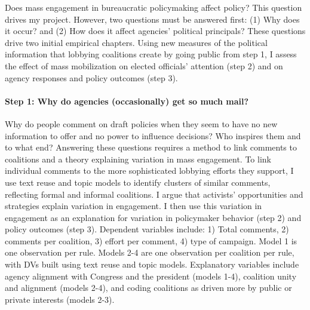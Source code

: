 Does mass engagement in bureaucratic policymaking affect policy? This question drives my project. However, two questions must be answered first: (1) Why does it occur? and (2) How does it affect agencies' political principals? These questions drive two initial empirical chapters.
Using new measures of the political information that lobbying coalitions create by going public from step 1, I assess the effect of mass mobilization on elected officials' attention (step 2) and on agency responses and policy outcomes (step 3).%

\paragraph{Step 1: Why do agencies (occasionally) get so much mail?} 



Why do people comment on draft policies when they seem to have no new information to offer and no power to influence decisions? Who inspires them and to what end? 
Answering these questions requires a method to link comments to coalitions and a theory explaining variation in mass engagement.  
To link individual comments to the more sophisticated lobbying efforts they support, I use text reuse and topic models to identify clusters of similar comments, reflecting formal and informal coalitions.
I argue that activists' opportunities and strategies explain variation in engagement. %
I then use this variation in engagement as an explanation for variation in policymaker behavior (step 2) and policy outcomes (step 3). 
Dependent variables include: 
1) Total comments, %
2) comments per coalition, %
3) effort per comment, %
4) type of campaign. %
Model 1 is one observation per rule. Models 2-4 are one observation per coalition per rule, with DVs built using text reuse and topic models. Explanatory variables include agency alignment with Congress and the president (models 1-4), coalition unity and alignment (models 2-4), and coding coalitions as driven more by public or private interests (models 2-3).%


